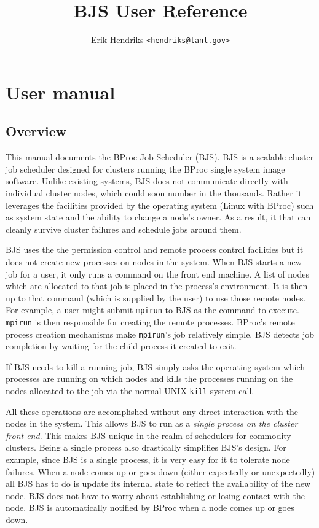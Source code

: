 \documentclass[oneside]{book}
\begin{document}
\title{BJS User Reference}
\author{Erik Hendriks \texttt{<hendriks@lanl.gov>}}

\maketitle

\tableofcontents

\part{User manual}
\chapter{Overview}

This manual documents the BProc Job Scheduler (BJS).  BJS is a
scalable cluster job scheduler designed for clusters running the BProc
single system image software.  Unlike existing systems, BJS does not
communicate directly with individual cluster nodes, which could soon
number in the thousands.  Rather it leverages the facilities provided
by the operating system (Linux with BProc) such as system state and
the ability to change a node's owner.  As a result, it that can
cleanly survive cluster failures and schedule jobs around them.

BJS uses the the permission control and remote process control
facilities but it does not create new processes on nodes in the
system.  When BJS starts a new job for a user, it only runs a command
on the front end machine.  A list of nodes which are allocated to that
job is placed in the process's environment.  It is then up to that
command (which is supplied by the user) to use those remote nodes.
For example, a user might submit \texttt{mpirun} to BJS as the command
to execute.  \texttt{mpirun} is then responsible for creating the
remote processes.  BProc's remote process creation mechanisms make
\texttt{mpirun}'s job relatively simple.  BJS detects job completion
by waiting for the child process it created to exit.

If BJS needs to kill a running job, BJS simply asks the operating
system which processes are running on which nodes and kills the
processes running on the nodes allocated to the job via the normal
UNIX \texttt{kill} system call.

All these operations are accomplished without any direct interaction
with the nodes in the system.  This allows BJS to run as a
\emph{single process on the cluster front end}.  This makes BJS unique
in the realm of schedulers for commodity clusters.  Being a single
process also drastically simplifies BJS's design.  For example, since
BJS is a single process, it is very easy for it to tolerate node
failures.  When a node comes up or goes down (either expectedly or
unexpectedly) all BJS has to do is update its internal state to
reflect the availability of the new node.  BJS does not have to worry
about establishing or losing contact with the node.  BJS is
automatically notified by BProc when a node comes up or goes down.
\end{document}
